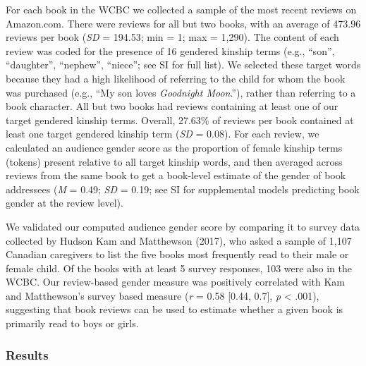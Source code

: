 \documentclass[
  english,
  ,man,floatsintext]{apa6}
\begin{document}
For each book in the WCBC we collected a sample of the most recent reviews on Amazon.com. There were reviews for all but two books, with an average of 473.96 reviews per book (\emph{SD} = 194.53; min = 1; max = 1,290). The content of each review was coded for the presence of 16 gendered kinship terms (e.g., \enquote{son}, \enquote{daughter}, \enquote{nephew}, \enquote{niece}; see SI for full list). We selected these target words because they had a high likelihood of referring to the child for whom the book was purchased (e.g., \enquote{My son loves \emph{Goodnight Moon}.}), rather than referring to a book character. All but two books had reviews containing at least one of our target gendered kinship terms. Overall, 27.63\% of reviews per book contained at least one target gendered kinship term (\emph{SD} = 0.08). For each review, we calculated an audience gender score as the proportion of female kinship terms (tokens) present relative to all target kinship words, and then averaged across reviews from the same book to get a book-level estimate of the gender of book addressees (\emph{M} = 0.49; \emph{SD} = 0.19; see SI for supplemental models predicting book gender at the review level).

We validated our computed audience gender score by comparing it to survey data collected by Hudson Kam and Matthewson (2017), who asked a sample of 1,107 Canadian caregivers to list the five books most frequently read to their male or female child. Of the books with at least 5 survey responses, 103 were also in the WCBC. Our review-based gender measure was positively correlated with Kam and Matthewson's survey based measure (\emph{r} = 0.58 {[}0.44, 0.7{]}, \emph{p} \textless{} .001), suggesting that book reviews can be used to estimate whether a given book is primarily read to boys or girls.

\hypertarget{results-2}{%
\subsubsection{Results}\label{results-2}}
\end{document}
